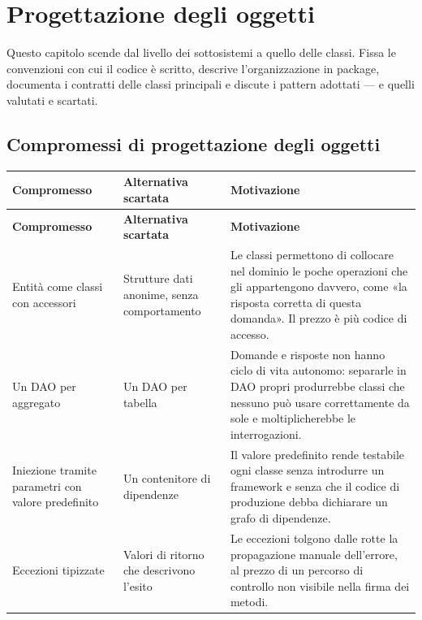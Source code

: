 \chapter{Progettazione degli oggetti}
\label{cap:sdd-object-design}

Questo capitolo scende dal livello dei sottosistemi a quello delle classi.
Fissa le convenzioni con cui il codice è scritto, descrive l'organizzazione
in package, documenta i contratti delle classi principali e discute i pattern
adottati — e quelli valutati e scartati.

\section{Compromessi di progettazione degli oggetti}

\begin{longtable}{@{}L{3.6cm} L{4.2cm} L{6.4cm}@{}}
\toprule
\textbf{Compromesso} & \textbf{Alternativa scartata} & \textbf{Motivazione} \\
\midrule
\endfirsthead
\toprule
\textbf{Compromesso} & \textbf{Alternativa scartata} & \textbf{Motivazione} \\
\midrule
\endhead
\bottomrule
\endlastfoot

Entità come classi con accessori &
Strutture dati anonime, senza comportamento &
Le classi permettono di collocare nel dominio le poche operazioni che gli
appartengono davvero, come «la risposta corretta di questa domanda». Il
prezzo è più codice di accesso. \\

Un DAO per aggregato &
Un DAO per tabella &
Domande e risposte non hanno ciclo di vita autonomo: separarle in DAO propri
produrrebbe classi che nessuno può usare correttamente da sole e
moltiplicherebbe le interrogazioni. \\

Iniezione tramite parametri con valore predefinito &
Un contenitore di dipendenze &
Il valore predefinito rende testabile ogni classe senza introdurre un
framework e senza che il codice di produzione debba dichiarare un grafo di
dipendenze. \\

Eccezioni tipizzate &
Valori di ritorno che descrivono l'esito &
Le eccezioni tolgono dalle rotte la propagazione manuale dell'errore, al
prezzo di un percorso di controllo non visibile nella firma dei metodi. \\

\end{longtable}

